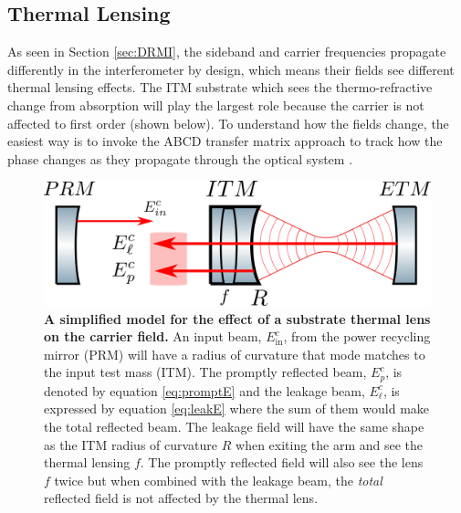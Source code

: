 	\subsection{Thermal Lensing}\label{Sec:TL_lensing}
	As seen in Section \ref{sec:DRMI}, the sideband and carrier frequencies propagate differently in the interferometer by design, which means their fields see different thermal lensing effects.  The ITM substrate which sees the thermo-refractive change from absorption will play the largest role because the carrier is not affected to first order (shown below). To understand how the fields change, the easiest way is to invoke the ABCD transfer matrix approach to track how the phase changes as they propagate through the optical system \cite{Lawrence_TCS}.
	
	\begin{figure}[ht!]
		\centering
		\includegraphics[width=.7 \textwidth]{../Figures/ThermalLensFP.png}
		\caption[A simplified model for the effect of a substrate thermal lens on the carrier field.]  
		{\textbf{A simplified model for the effect of a substrate thermal lens on the carrier field.} An input beam, $E_{\text{in}}^{c}$, from the power recycling mirror (PRM) will have a radius of curvature that mode matches to the input test mass (ITM).  The promptly reflected beam, $E_{p}^{c}$, is denoted by equation \ref{eq:promptE} and the leakage beam, $E_{\ell}^{c}$, is expressed by equation \ref{eq:leakE} where the sum of them would make the total reflected beam.  The leakage field will have the same shape as the ITM radius of curvature $R$ when exiting the arm and see the thermal lensing $f$. The promptly reflected field will also see the lens $f$ twice but when combined with the leakage beam, the \textit{total} reflected field is not affected by the thermal lens.}
		\label{fig:ThermalLensFP}
	\end{figure}
